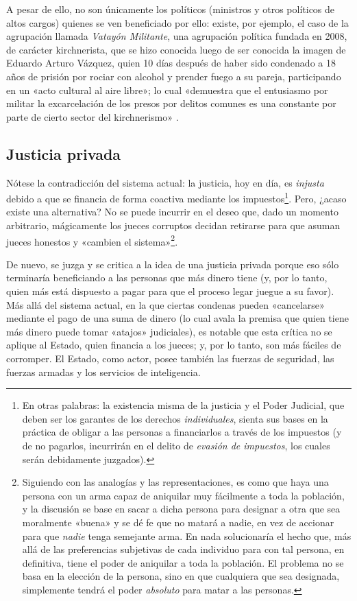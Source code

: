 \documentclass[12pt,a4paper,twoside]{book}
\begin{document}
A pesar de ello, no son únicamente los políticos (ministros y otros políticos de altos cargos) quienes se ven beneficiado por ello: existe, por ejemplo, el caso de la agrupación llamada \textit{Vatayón Militante}, una agrupación política fundada en 2008, de carácter kirchnerista, que se hizo conocida luego de ser conocida la imagen de Eduardo Arturo Vázquez, quien 10 días después de haber sido condenado a 18 años de prisión por rociar con alcohol y prender fuego a su pareja, participando en un «acto cultural al aire libre»; lo cual «demuestra que el entusiasmo por militar la excarcelación de los presos por delitos comunes es una constante por parte de cierto sector del kirchnerismo» \cite{vatayonmilitante}.

\subsection{Justicia privada}
Nótese la contradicción del sistema actual: la justicia, hoy en día, es \textit{injusta} debido a que se financia de forma coactiva mediante los impuestos\footnote{En otras palabras: la existencia misma de la justicia y el Poder Judicial, que deben ser los garantes de los derechos \textit{individuales}, sienta sus bases en la práctica de obligar a las personas a financiarlos a través de los impuestos (y de no pagarlos, incurrirán en el delito de \textit{evasión de impuestos}, los cuales serán debidamente juzgados).}. Pero, ¿acaso existe una alternativa? No se puede incurrir en el deseo que, dado un momento arbitrario, mágicamente los jueces corruptos decidan retirarse para que asuman jueces honestos y «cambien el sistema»\footnote{Siguiendo con las analogías y las representaciones, es como que haya una persona con un arma capaz de aniquilar muy fácilmente a toda la población, y la discusión se base en sacar a dicha persona para designar a otra que sea moralmente «buena» y se dé fe que no matará a nadie, en vez de accionar para que \textit{nadie} tenga semejante arma. En nada solucionaría el hecho que, más allá de las preferencias subjetivas de cada individuo para con tal persona, en definitiva, tiene el poder de aniquilar a toda la población. El problema no se basa en la elección de la persona, sino en que cualquiera que sea designada, simplemente tendrá el poder \textit{absoluto} para matar a las personas.}.

De nuevo, se juzga y se critica a la idea de una justicia privada porque eso sólo terminaría beneficiando a las personas que más dinero tiene (y, por lo tanto, quien más está dispuesto a pagar para que el proceso legar juegue a su favor). Más allá del sistema actual, en la que ciertas condenas pueden «cancelarse» mediante el pago de una suma de dinero (lo cual avala la premisa que quien tiene más dinero puede tomar «atajos» judiciales), es notable que esta crítica no se aplique al Estado, quien financia a los jueces; y, por lo tanto, son más fáciles de corromper. El Estado, como actor, posee también las fuerzas de seguridad, las fuerzas armadas y los servicios de inteligencia.
\end{document}
